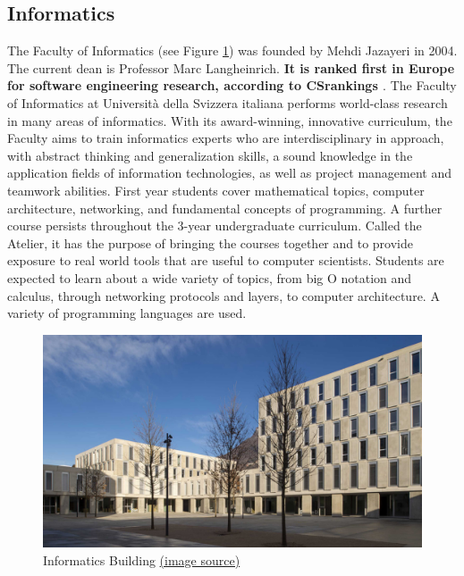 \documentclass[letterpaper,11pt]{article}
\begin{document}
\begin{multicols}{2}
\subsection{Informatics}
\label{section:2.4}
The Faculty of Informatics (see Figure \ref{figure:2}) was founded by Mehdi Jazayeri \cite{mj} in 2004. The
current dean is Professor Marc Langheinrich.
\textbf{It is ranked first in Europe for software engineering research, according to CSrankings \cite{cr}}.
The Faculty of Informatics at Universit\`a della Svizzera italiana performs world-class research in many areas of informatics.
With its award-winning, innovative curriculum, the Faculty aims to train informatics experts who are interdisciplinary in approach, with abstract thinking and generalization skills, a sound knowledge in the application fields of information technologies, as well as project management and teamwork abilities.
First year students cover mathematical topics, computer architecture, networking, and fundamental concepts of programming.
A further course persists throughout the 3-year undergraduate curriculum.
Called the Atelier, it has the purpose of bringing the courses together and to provide exposure to real world tools that are useful to computer scientists.
Students are expected to learn about a wide variety of topics, from big O notation and calculus, through networking protocols and layers, to computer architecture.
A variety of programming languages are used.
\end{multicols}
\begin{figure}[t!]
    \centering
    \includegraphics[width=\linewidth]{usi2.jpg}
    \caption{Informatics Building 
        \href{https://www.usi.ch/sites/default/files/storage/images/press-usi-campus-est-01.jpg}{(image source)}}
    \label{figure:2}
\end{figure}
\end{document}
